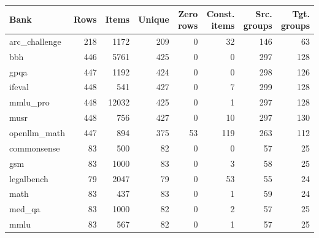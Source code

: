\begin{tabular}{lrrrrrrr}
\toprule
Bank & Rows & Items & Unique & Zero rows & Const. items & Src. groups & Tgt. groups \\
\midrule
arc\_challenge & 218 & 1172 & 209 & 0 & 32 & 146 & 63 \\
bbh & 446 & 5761 & 425 & 0 & 0 & 297 & 128 \\
gpqa & 447 & 1192 & 424 & 0 & 0 & 298 & 126 \\
ifeval & 448 & 541 & 427 & 0 & 7 & 299 & 128 \\
mmlu\_pro & 448 & 12032 & 425 & 0 & 1 & 297 & 128 \\
musr & 448 & 756 & 427 & 0 & 10 & 297 & 130 \\
openllm\_math & 447 & 894 & 375 & 53 & 119 & 263 & 112 \\
commonsense & 83 & 500 & 82 & 0 & 0 & 57 & 25 \\
gsm & 83 & 1000 & 83 & 0 & 3 & 58 & 25 \\
legalbench & 79 & 2047 & 79 & 0 & 53 & 55 & 24 \\
math & 83 & 437 & 83 & 0 & 1 & 59 & 24 \\
med\_qa & 83 & 1000 & 82 & 0 & 2 & 57 & 25 \\
mmlu & 83 & 567 & 82 & 0 & 1 & 57 & 25 \\
\bottomrule
\end{tabular}
